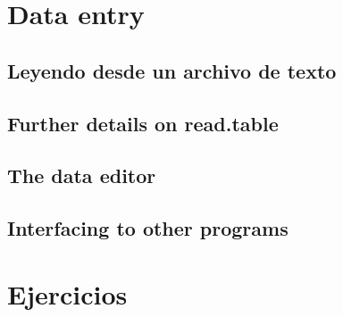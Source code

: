 \section{Data entry}
\subsection{Leyendo desde un archivo de texto} \label{readtextfile}
\subsection{Further details on read.table}
\subsection{The data editor}
\subsection{Interfacing to other programs}
\section{Ejercicios}
